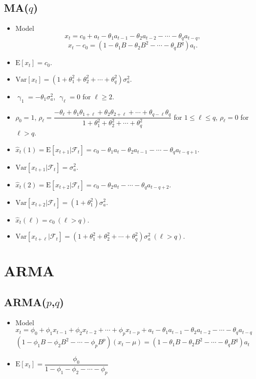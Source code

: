 \documentclass{report}
\theoremstyle{nonumberplain}
\newcommand{\E}{\mathrm{E}}
\newcommand{\Var}{\mathrm{Var}}
\newcommand{\0}{\mathbf{0}}
\begin{document}
\subsection{MA($q$)}
\begin{itemize}
	\item Model
	\[
	x_{t}=c_0+a_t-\theta_1a_{t-1}-\theta_2a_{t-2}-\cdots-\theta_qa_{t-q},
	\]
	\[
	x_{t}-c_0=(1-\theta_1B-\theta_2B^2-\cdots-\theta_qB^q)a_t.
	\]
	\item $\E[x_t]=c_0$.
	\item $\Var[x_t]=(1+\theta_1^2+\theta_2^2+\cdots+\theta_q^2)\sigma_a^2$.
	\item $\upgamma_1=-\theta_1\sigma_a^2$, $\upgamma_\ell=0$ for $\ell\ge2$.
	\item $\rho_0=1$, $\rho_\ell=\dfrac{-\theta_\ell+\theta_1\theta_{1+\ell}+\theta_{2}\theta_{2+\ell}+\cdots+\theta_{q-\ell}\theta_{q}}{1+\theta_1^2+\theta_2^2+\cdots+\theta_q^2}$ for $1\le\ell\le q$, $\rho_\ell=0$ for $\ell>q$.
	\item $\hat{x}_t(1)=\E[x_{t+1}|\mathcal{F}_t]=c_0-\theta_1a_{t}-\theta_2a_{t-1}-\cdots-\theta_qa_{t-q+1}$.
	\item $\Var[x_{t+1}|\mathcal{F}_t]=\sigma_a^2$.
	\item $\hat{x}_t(2)=\E[x_{t+2}|\mathcal{F}_t]=c_0-\theta_2a_{t}-\cdots-\theta_qa_{t-q+2}$.
	\item $\Var[x_{t+2}|\mathcal{F}_t]=(1+\theta_1^2)\sigma_a^2$.
	\item $\hat{x}_t(\ell)=c_0\ (\ell>q)$.
	\item $\Var[x_{t+\ell}|\mathcal{F}_t]=(1+\theta_1^2+\theta_2^2+\cdots+\theta_q^2)\sigma_a^2\ (\ell>q)$.
\end{itemize}
\section{ARMA}
\subsection{ARMA($p$,$q$)}
\begin{itemize}
	\item Model
	\[
	x_{t}=\phi_0+\phi_1x_{t-1}+\phi_2x_{t-2}+\cdots+\phi_px_{t-p}+a_t-\theta_1a_{t-1}-\theta_2a_{t-2}-\cdots-\theta_qa_{t-q}
	\]
	\[
	(1-\phi_1B-\phi_2B^2-\cdots-\phi_pB^p)(x_{t}-\mu)=(1-\theta_1B-\theta_2B^2-\cdots-\theta_qB^q)a_t
	\]
	\item $\E[x_t]=\dfrac{\phi_0}{1-\phi_1-\phi_2-\cdots-\phi_p}$
\end{itemize}
\end{document}
